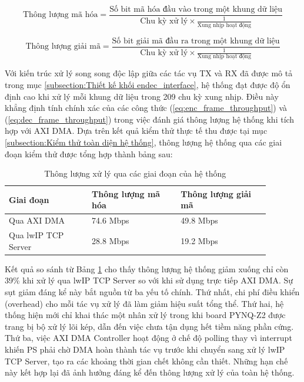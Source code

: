 \documentclass[../DoAn.tex]{subfiles}
\begin{document}
\begin{equation}
\text{Thông lượng mã hóa} = \frac{\text{Số bit mã hóa đầu vào trong một khung dữ liệu}}{\text{Chu kỳ xử lý}\times\frac{1}{\text{Xung nhịp hoạt động}} }
\label{eq:enc_frame_throughput}
\end{equation}

\begin{equation}
\text{Thông lượng giải mã} = \frac{\text{Số bit giải mã đầu ra trong một khung dữ liệu}}{\text{Chu kỳ xử lý}\times\frac{1}{\text{Xung nhịp hoạt động}} }
\label{eq:dec_frame_throughput}
\end{equation}

Với kiến trúc xử lý song song độc lập giữa các tác vụ TX và RX đã được mô tả trong mục \ref{subsection:Thiết kế khối endec_interface}, hệ thống đạt được độ ổn định cao khi xử lý mỗi khung dữ liệu trong 209 chu kỳ xung nhịp. Điều này khẳng định tính chính xác của các công thức (\ref{eq:enc_frame_throughput}) và (\ref{eq:dec_frame_throughput}) trong việc đánh giá thông lượng hệ thống khi tích hợp với AXI DMA. Dựa trên kết quả kiểm thử thực tế thu được tại mục \ref{subsection:Kiểm thử toàn diện hệ thống}, thông lượng hệ thống qua các giai đoạn kiểm thử được tổng hợp thành bảng sau:

\begin{table}[H]
\centering{}
    \caption{Thông lượng xử lý qua các giai đoạn của hệ thống}
    \begin{tabular}{|p{0.28\linewidth}|p{0.3\linewidth}|p{0.3\linewidth}|}
        \hline
        \textbf{Giai đoạn} & \textbf{Thông lượng mã hóa} & \textbf{Thông lượng giải mã}\\ \hline\hline
        Qua AXI DMA  & 74.6 Mbps & 49.8 Mbps \\ \hline
        Qua lwIP TCP Server  & 28.8 Mbps & 19.2 Mbps \\ \hline
        \end{tabular}
        \label{table:Thông lượng xử lý qua các giai đoạn của hệ thống}
\end{table}

Kết quả so sánh từ Bảng \ref{table:Thông lượng xử lý qua các giai đoạn của hệ thống} cho thấy thông lượng hệ thống giảm xuống chỉ còn 39\% khi xử lý qua lwIP TCP Server so với khi sử dụng trực tiếp AXI DMA. Sự sụt giảm đáng kể này bắt nguồn từ ba yếu tố chính. Thứ nhất, chi phí điều khiển (overhead) cho mỗi tác vụ xử lý đã làm giảm hiệu suất tổng thể. Thứ hai, hệ thống hiện mới chỉ khai thác một nhân xử lý trong khi board PYNQ-Z2 được trang bị bộ xử lý lõi kép, dẫn đến việc chưa tận dụng hết tiềm năng phần cứng. Thứ ba, việc AXI DMA Controller hoạt động ở chế độ polling thay vì interrupt khiến PS phải chờ DMA hoàn thành tác vụ trước khi chuyển sang xử lý lwIP TCP Server, tạo ra các khoảng thời gian chết không cần thiết. Những hạn chế này kết hợp lại đã ảnh hưởng đáng kể đến thông lượng xử lý của toàn hệ thống.
 
\end{document}
